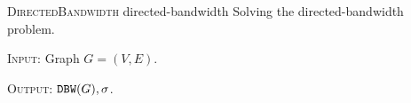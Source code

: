 \begin{cccAlgorithm}
    {\textsc{DirectedBandwidth}}
    {directed-bandwidth}
    {Solving the directed-bandwidth problem.}

    \textsc{Input:} Graph $G = (V, E)$.

    \begin{algorithmic}[1]
        \EndIf
        \EndFor
    \end{algorithmic}

    \textsc{Output:} $\mathtt{DBW}(G), \sigma$.
\end{cccAlgorithm}